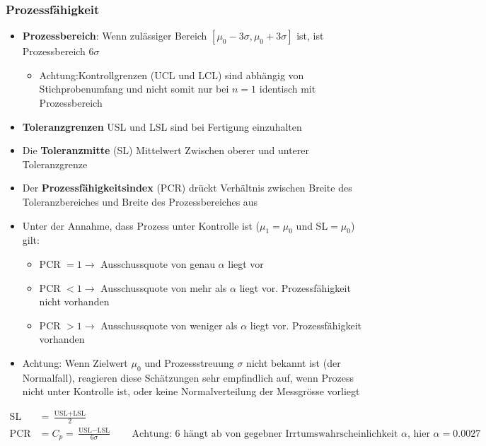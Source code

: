 \subsubsection{Prozessfähigkeit}
\begin{itemize}
	\item \textbf{Prozessbereich}: Wenn zulässiger Bereich $\left[\mu_0-3\sigma, \mu_0+3\sigma\right]$ ist, ist Prozessbereich $6\sigma$
	\begin{itemize}
		\item Achtung:Kontrollgrenzen (UCL und LCL) sind abhängig von Stichprobenumfang und nicht somit nur bei $n=1$ identisch mit Prozessbereich
	\end{itemize}
	\item \textbf{Toleranzgrenzen} USL und LSL sind bei Fertigung einzuhalten
	\item Die \textbf{Toleranzmitte} (SL) Mittelwert Zwischen oberer und unterer Toleranzgrenze
	\item Der \textbf{Prozessfähigkeitsindex} (PCR) drückt Verhältnis zwischen Breite des Toleranzbereiches und Breite des Prozessbereiches aus
	\item Unter der Annahme, dass Prozess unter Kontrolle ist ($\mu_1 = \mu_0$ und SL$=\mu_0$) gilt:
	\begin{itemize}
		\item PCR $= 1 \rightarrow$ Ausschussquote von genau $\alpha$ liegt vor
		\item PCR $< 1 \rightarrow$ Ausschussquote von mehr als $\alpha$ liegt vor. Prozessfähigkeit nicht vorhanden
		\item PCR $> 1 \rightarrow$ Ausschussquote von weniger als $\alpha$ liegt vor. Prozessfähigkeit vorhanden
	\end{itemize}
	\item Achtung: Wenn Zielwert $\mu_0$ und Prozessstreuung $\sigma$ nicht bekannt ist (der Normalfall), reagieren diese Schätzungen sehr empfindlich auf, wenn Prozess nicht unter Kontrolle ist, oder keine Normalverteilung der Messgrösse vorliegt
\end{itemize}
\begin{align}
	\text{SL} &= \frac{\text{USL}+\text{LSL}}{2}\\
	\text{PCR} &= C_p = \frac{\text{USL}-\text{LSL}}{6\sigma} \qquad \text{Achtung: 6 hängt ab von gegebner Irrtumswahrscheinlichkeit }\alpha \text{, hier }\alpha=0.0027\\
\end{align}

\newpage

